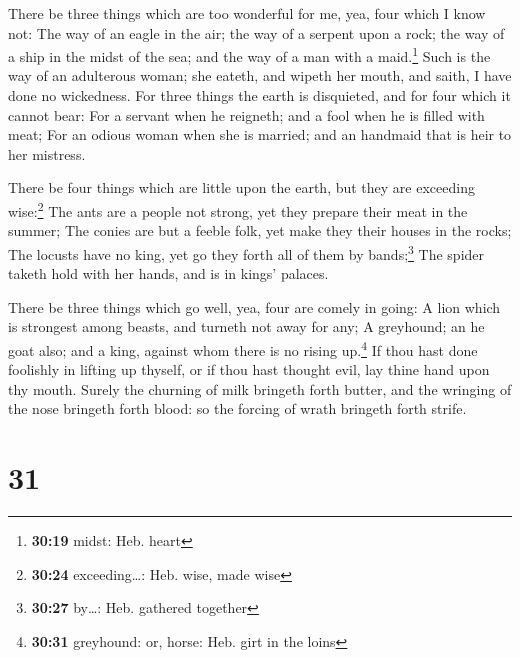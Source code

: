  There be three things which are too wonderful for me,
yea, four which I know not:  The way of an eagle in the
air; the way of a serpent upon a rock; the way of a ship in the midst of
the sea; and the way of a man with a maid.\footnote{\textbf{30:19}
  midst: Heb. heart}  Such is the way of an adulterous
woman; she eateth, and wipeth her mouth, and saith, I have done no
wickedness.  For three things the earth is disquieted,
and for four which it cannot bear:  For a servant when he
reigneth; and a fool when he is filled with meat;  For an
odious woman when she is married; and an handmaid that is heir to her
mistress.

 There be four things which are little upon the earth,
but they are exceeding wise:\footnote{\textbf{30:24} exceeding\ldots:
  Heb. wise, made wise}  The ants are a people not
strong, yet they prepare their meat in the summer;  The
conies are but a feeble folk, yet make they their houses in the rocks;
 The locusts have no king, yet go they forth all of them
by bands;\footnote{\textbf{30:27} by\ldots: Heb. gathered together}
 The spider taketh hold with her hands, and is in kings'
palaces.

 There be three things which go well, yea, four are
comely in going:  A lion which is strongest among beasts,
and turneth not away for any;  A greyhound; an he goat
also; and a king, against whom there is no rising up.\footnote{\textbf{30:31}
  greyhound: or, horse: Heb. girt in the loins}  If thou
hast done foolishly in lifting up thyself, or if thou hast thought evil,
lay thine hand upon thy mouth.  Surely the churning of
milk bringeth forth butter, and the wringing of the nose bringeth forth
blood: so the forcing of wrath bringeth forth strife.

\hypertarget{section-30}{%
\section{31}\label{section-30}}

